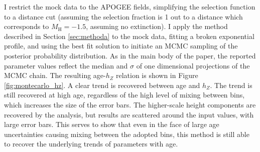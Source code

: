 I restrict the mock data to the APOGEE fields, simplifying the selection function to a distance cut (assuming the selection fraction is 1 out to a distance which corresponds to $M_\mathrm{H}= -1.5$, assuming no extinction).  I apply the method described in Section \ref{sec:methoda} to the mock data, fitting a broken exponential profile, and using the best fit solution to initiate an MCMC sampling of the posterior probability distribution. As in the main body of the paper, the reported parameter values reflect the median and $\sigma$ of one dimensional projections of the MCMC chain. The resulting age-$h_Z$ relation is shown in Figure \ref{fig:montecarlo_hz}.  A clear trend is recovered between age and $h_Z$. The trend is still recovered at high age, regardless of the high level of mixing between bins, which increases the size of the error bars. The higher-scale height components are recovered by the analysis, but results are scattered around the input values, with large error bars. This serves to show that even in the face of large age uncertainties causing mixing between the adopted bins, this method is still able to recover the underlying trends of parameters with age.

